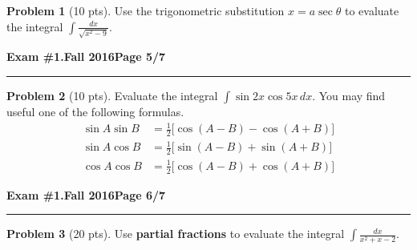 \documentclass[12pt]{article}
\theoremstyle{definition}
\newtheorem{problem}{Problem}
\begin{document}
\bigskip
\begin{problem}[10 pts]
Use the trigonometric substitution $x=a\sec \theta$ to evaluate the integral $\displaystyle{\int \frac{dx}{\sqrt{x^2-9}}}$.
\vspace{18cm}
\begin{flushright}
\end{flushright}
\end{problem}
\newpage

\hfill{\large\bf Exam \#1.}\hfill{\large\bf Fall 2016}\hfill{\large\bf Page 5/7}\hrule

\bigskip
\begin{problem}[10 pts]
Evaluate the integral $\displaystyle{\int \sin 2x \cos 5x\, dx}$. \newline You may find useful one of the following formulas.
\begin{align*}
\sin A \sin B &= \frac{1}{2} \big[ \cos (A-B) - \cos (A+B) \big] \\
\sin A \cos B &= \frac{1}{2} \big[ \sin (A-B) + \sin (A+B) \big] \\
\cos A \cos B &= \frac{1}{2} \big[ \cos (A-B) + \cos (A+B) \big]
\end{align*}
\vspace{16cm}
\begin{flushright}
\end{flushright}
\end{problem}
\newpage

\hfill{\large\bf Exam \#1.}\hfill{\large\bf Fall 2016}\hfill{\large\bf Page 6/7}\hrule
  
\bigskip
\begin{problem}[20 pts]
Use \textbf{partial fractions} to evaluate the integral $\displaystyle{\int \frac{dx}{x^2+x-2}}$.
\vspace{18cm}
\begin{flushright}
\end{flushright}
\end{problem}
\newpage
\end{document}
